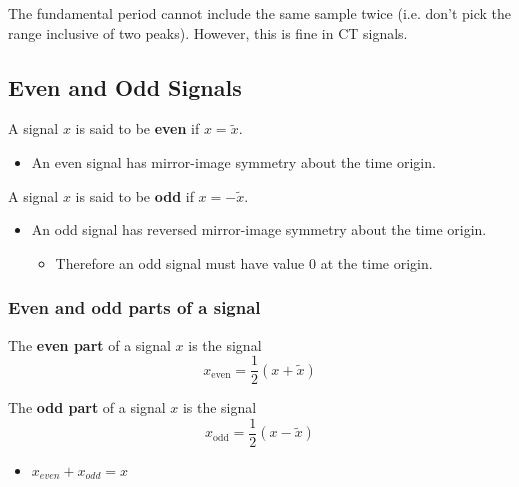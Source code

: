     \begin{example}
    \end{example}

    \begin{warning}
        The fundamental period cannot include the same sample twice (i.e. don't pick the range inclusive of two peaks). However, this is fine in CT signals.
    \end{warning}

\subsection{Even and Odd Signals}
\begin{definition} 

    A signal \(x\) is said to be \textbf{even} if \(x = \tilde{x}\).
    \begin{itemize}
        \item An even signal has mirror-image symmetry about the time origin.
    \end{itemize}
    \vspace{1em}

    A signal \(x\) is said to be \textbf{odd} if \(x = -\tilde{x}\).

    \begin{itemize}
        \item An odd signal has reversed mirror-image symmetry about the time origin.
        \begin{itemize}
            \item Therefore an odd signal must have value 0 at the time origin.
        \end{itemize}
    \end{itemize}
\end{definition}

\begin{example}
\end{example}

    \subsubsection{Even and odd parts of a signal}
    \begin{definition}

        The \textbf{even part} of a signal \(x\) is the signal
        \begin{equation}
            x_{\text{even}} = \frac{1}{2}(x + \tilde{x})    
        \end{equation}

        The \textbf{odd part} of a signal \(x\) is the signal
        \begin{equation}
            x_{\text{odd}} = \frac{1}{2}(x - \tilde{x})
        \end{equation}

        \begin{itemize}
            \item $x_{even} + x_{odd} = x$
        \end{itemize}
    \end{definition}

